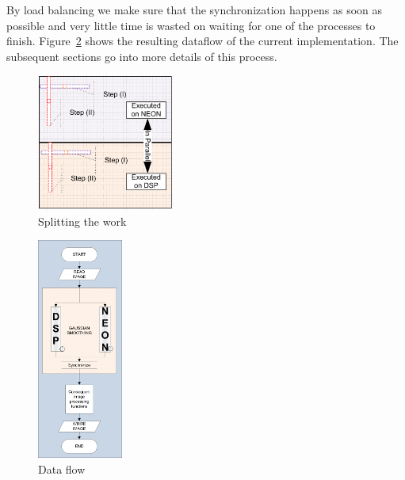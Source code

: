 By load balancing we make sure that the synchronization happens as soon as possible and very little time is wasted on waiting for one of the processes to finish. Figure~\ref{fig:dataflow} shows the resulting dataflow of the current implementation. The subsequent sections go into more details of this process.

\begin{figure}
\centering
\includegraphics[width=0.4\textwidth]{drawings/gaussian_balancing}
\caption{Splitting the work}
\label{fig:balancing}
\end{figure}

\begin{figure}
\centering
\includegraphics[width=0.25\textwidth]{drawings/model}
\caption{Data flow}
\label{fig:dataflow}
\end{figure}



